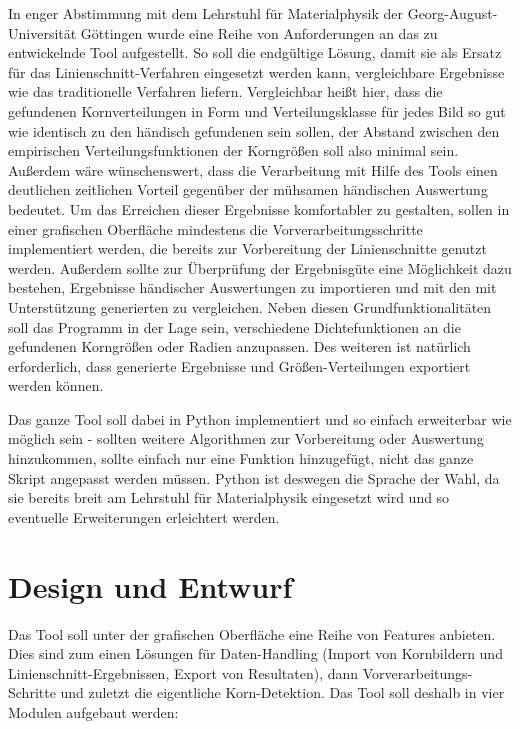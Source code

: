 \documentclass[
  12pt,
  openany]{book}
\begin{document}
In enger Abstimmung mit dem Lehrstuhl für Materialphysik der Georg-August-Universität Göttingen wurde eine Reihe von Anforderungen an das zu entwickelnde Tool aufgestellt.
So soll die endgültige Lösung, damit sie als Ersatz für das Linienschnitt-Verfahren eingesetzt werden kann, vergleichbare Ergebnisse wie das traditionelle Verfahren liefern. Vergleichbar heißt hier, dass die gefundenen Kornverteilungen in Form und Verteilungsklasse für jedes Bild so gut wie identisch zu den händisch gefundenen sein sollen, der Abstand zwischen den empirischen Verteilungsfunktionen der Korngrößen soll also minimal sein.
Außerdem wäre wünschenswert, dass die Verarbeitung mit Hilfe des Tools einen deutlichen zeitlichen Vorteil gegenüber der mühsamen händischen Auswertung bedeutet.
Um das Erreichen dieser Ergebnisse komfortabler zu gestalten, sollen in einer grafischen Oberfläche mindestens die Vorverarbeitungsschritte implementiert werden, die bereits zur Vorbereitung der Linienschnitte genutzt werden. Außerdem sollte zur Überprüfung der Ergebnisgüte eine Möglichkeit dazu bestehen, Ergebnisse händischer Auswertungen zu importieren und mit den mit Unterstützung generierten zu vergleichen.
Neben diesen Grundfunktionalitäten soll das Programm in der Lage sein, verschiedene Dichtefunktionen an die gefundenen Korngrößen oder Radien anzupassen. Des weiteren ist natürlich erforderlich, dass generierte Ergebnisse und Größen-Verteilungen exportiert werden können.

Das ganze Tool soll dabei in Python implementiert und so einfach erweiterbar wie möglich sein - sollten weitere Algorithmen zur Vorbereitung oder Auswertung hinzukommen, sollte einfach nur eine Funktion hinzugefügt, nicht das ganze Skript angepasst werden müssen. Python ist deswegen die Sprache der Wahl, da sie bereits breit am Lehrstuhl für Materialphysik eingesetzt wird und so eventuelle Erweiterungen erleichtert werden.

\hypertarget{design-und-entwurf}{%
\chapter{Design und Entwurf}\label{design-und-entwurf}}

Das Tool soll unter der grafischen Oberfläche eine Reihe von Features anbieten. Dies sind zum einen Lösungen für Daten-Handling (Import von Kornbildern und Linienschnitt-Ergebnissen, Export von Resultaten), dann Vorverarbeitungs-Schritte und zuletzt die eigentliche Korn-Detektion. Das Tool soll deshalb in vier Modulen aufgebaut werden:
\end{document}
